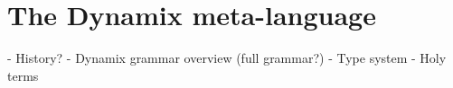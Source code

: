 
\chapter{\label{ch:dynamix}The Dynamix meta-language}

- History?
- Dynamix grammar overview (full grammar?)
- Type system
- Holy terms
